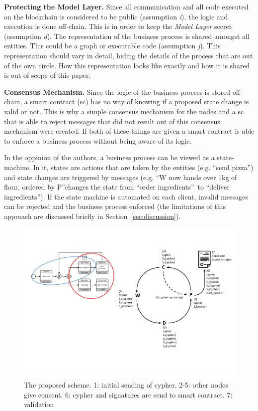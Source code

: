 \documentclass[runningheads]{llncs}
\newcommand{\ber}[1]{\textit{#1}}
\newcommand{\refsec}[1]{Section~\ref{#1}}
\renewcommand{\bigbreak}{}
\newcommand{\quotel}{``}
\newcommand{\quoter}{''}
\begin{document}
\bigbreak
\textbf{Protecting the Model Layer.} Since all communication and all code executed on the blockchain is considered to be public  (assumption \ber{i}), the logic and execution is done off-chain. This is in order to keep the \ber{Model Layer} secret (assumption \ber{d}). The representation of the business process is shared amongst all entities. This could be a graph or executable code (assumption \ber{j}). This representation should vary in detail, hiding the details of the process that are out of the own circle. How this representation looks like exactly and how it is shared is out of scope of this paper.


\bigbreak
\textbf{Consensus Mechanism.} Since the logic of the business process is stored off-chain, a smart contract (sc) has no way of knowing if a proposed state change is valid or not. This is why a simple consensus mechanism for the nodes and a sc that is able to reject messages that did not result out of this consensus mechanism were created. If both of these things are given a smart contract is able to enforce a business process without being aware of its logic. 

In the oppinion of the authors, a business process can be viewed as a state-machine. In it, states are actions that are taken by the entities (e.g. \quotel send pizza\quoter ) and state changes are triggered by messages (e.g. \quotel W now hands over 1kg of flour, ordered by P\quoter  changes the state from \quotel order ingredients\quoter \  to \quotel deliver ingredients\quoter ). If the state machine is automated on each client, invalid messages can be rejected and the business process enforced (the limitations of this approach are discussed briefly in \refsec{sec:discussion}).

\begin{center}
\begin{figure}
    \centering
    \includegraphics[trim=13cm 4cm 0cm 3cm,clip=true,scale=0.5]{schema.pdf}
    \caption{The proposed scheme. 1: initial sending of cypher. 2-5: other nodes give consent. 6: cypher and signatures are send to smart contract. 7: validation} 
    \label{fig:scheme}
\end{figure}
\end{center}
\end{document}
